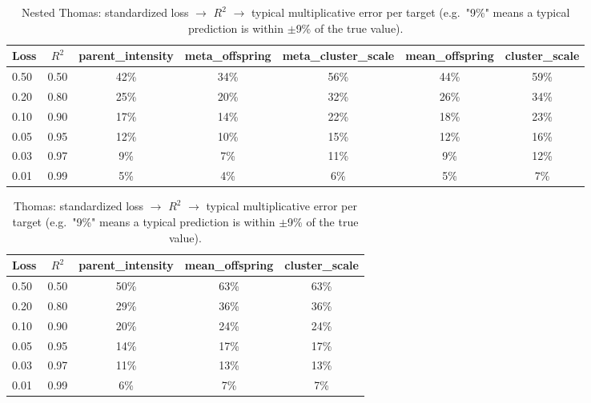 \begin{table}[htbp]
\centering
\small
\begin{tabular}{lcccccc}
\toprule
Loss & $R^2$ & parent\_intensity & meta\_offspring & meta\_cluster\_scale & mean\_offspring & cluster\_scale \\
\midrule
0.50 & 0.50 & 42\% & 34\% & 56\% & 44\% & 59\% \\
0.20 & 0.80 & 25\% & 20\% & 32\% & 26\% & 34\% \\
0.10 & 0.90 & 17\% & 14\% & 22\% & 18\% & 23\% \\
0.05 & 0.95 & 12\% & 10\% & 15\% & 12\% & 16\% \\
0.03 & 0.97 & 9\% & 7\% & 11\% & 9\% & 12\% \\
0.01 & 0.99 & 5\% & 4\% & 6\% & 5\% & 7\% \\
\bottomrule
\end{tabular}
\caption{Nested Thomas: standardized loss $\to$ $R^2$ $\to$ typical multiplicative error per target (e.g.\ "9\%" means a typical prediction is within $\pm$9\% of the true value).}
\label{tab:loss-units-nested-thomas}
\end{table}

\begin{table}[htbp]
\centering
\small
\begin{tabular}{lcccc}
\toprule
Loss & $R^2$ & parent\_intensity & mean\_offspring & cluster\_scale \\
\midrule
0.50 & 0.50 & 50\% & 63\% & 63\% \\
0.20 & 0.80 & 29\% & 36\% & 36\% \\
0.10 & 0.90 & 20\% & 24\% & 24\% \\
0.05 & 0.95 & 14\% & 17\% & 17\% \\
0.03 & 0.97 & 11\% & 13\% & 13\% \\
0.01 & 0.99 & 6\% & 7\% & 7\% \\
\bottomrule
\end{tabular}
\caption{Thomas: standardized loss $\to$ $R^2$ $\to$ typical multiplicative error per target (e.g.\ "9\%" means a typical prediction is within $\pm$9\% of the true value).}
\label{tab:loss-units-thomas}
\end{table}
